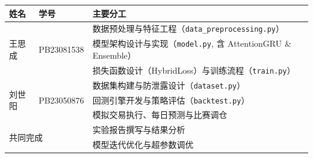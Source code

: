 \documentclass[10pt,a4paper]{ctexart}
\begin{document}
\begin{table}[htbp]
    \centering
    \small
    \begin{tabular}{p{2.2cm}p{3.0cm}p{8.8cm}}
        \toprule
        姓名 & 学号 & 主要分工 \\
        \midrule
        \multirow{3}{*}{王思成} & \multirow{3}{*}{PB23081538} & 数据预处理与特征工程（\texttt{data\_preprocessing.py}） \\
        & & 模型架构设计与实现（\texttt{model.py}, 含 AttentionGRU \& Ensemble） \\
        & & 损失函数设计（HybridLoss）与训练流程（\texttt{train.py}） \\
        \midrule
        \multirow{3}{*}{刘世阳} & \multirow{3}{*}{PB23050876} & 数据集构建与防泄露设计（\texttt{dataset.py}） \\
        & & 回测引擎开发与策略评估（\texttt{backtest.py}） \\
        & & 模拟交易执行、每日预测与比赛调仓 \\
        \midrule
        \multicolumn{2}{l}{\multirow{2}{*}{共同完成}} & 实验报告撰写与结果分析 \\
        \multicolumn{2}{l}{} & 模型迭代优化与超参数调优 \\
        \bottomrule
    \end{tabular}
\end{table}
\end{document}
